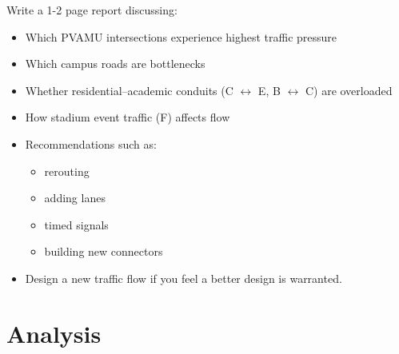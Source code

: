 \documentclass{ximera}
\begin{document}
\vspace{1in}

Write a 1-2 page report discussing:
\begin{itemize}
    \item Which PVAMU intersections experience highest traffic pressure
    \item Which campus roads are bottlenecks
    \item Whether residential--academic conduits (C $\leftrightarrow$ E, B $\leftrightarrow$ C) are overloaded
    \item How stadium event traffic (F) affects flow
    \item Recommendations such as: 
    \begin{itemize}
        \item rerouting
        \item adding lanes
        \item timed signals
        \item building new connectors
    \end{itemize}
    \item Design a new traffic flow if you feel a better design is warranted.
\end{itemize}

\newpage

\section*{Analysis}
\end{document}
